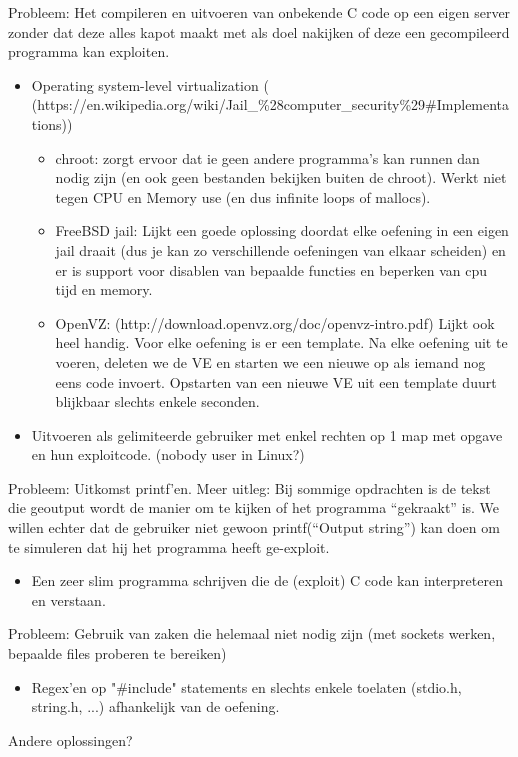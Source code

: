 Probleem: Het compileren en uitvoeren van onbekende C code op een eigen server zonder dat deze alles kapot maakt met als doel nakijken of deze een gecompileerd programma kan exploiten.
\begin{itemize}
\item Operating system-level virtualization (\\(https://en.wikipedia.org/wiki/Jail\_\%28computer\_security\%29\#Implementations))
	\begin{itemize}
	\item chroot: zorgt ervoor dat ie geen andere programma's kan runnen dan nodig zijn (en ook geen bestanden bekijken buiten de chroot). Werkt niet tegen CPU en Memory use (en dus infinite loops of mallocs).
	\item FreeBSD jail: Lijkt een goede oplossing doordat elke oefening in een eigen jail draait (dus je kan zo verschillende oefeningen van elkaar scheiden) en er is support voor disablen van bepaalde functies en beperken van cpu tijd en memory.
	\item OpenVZ: (http://download.openvz.org/doc/openvz-intro.pdf) Lijkt ook heel handig. Voor elke oefening is er een template. Na elke oefening uit te voeren, deleten we de VE en starten we een nieuwe op als iemand nog eens code invoert. Opstarten van een nieuwe VE uit een template duurt blijkbaar slechts enkele seconden.
	\end{itemize}
\item Uitvoeren als gelimiteerde gebruiker met enkel rechten op 1 map met opgave en hun exploitcode. (nobody user in Linux?)
\end{itemize}
        
Probleem: Uitkomst printf'en. Meer uitleg: Bij sommige opdrachten is de tekst die geoutput wordt de manier om te kijken of het programma ``gekraakt'' is. We willen echter dat de gebruiker niet gewoon printf(``Output string'') kan doen om te simuleren dat hij het programma heeft ge-exploit.

\begin{itemize}
\item Een zeer slim programma schrijven die de (exploit) C code kan interpreteren en verstaan.
\end{itemize}
    
Probleem: Gebruik van zaken die helemaal niet nodig zijn (met sockets werken, bepaalde files proberen te bereiken)

\begin{itemize}
\item Regex'en op "\#include" statements en slechts enkele toelaten (stdio.h, string.h, ...) afhankelijk van de oefening. 
\end{itemize}
Andere oplossingen?


